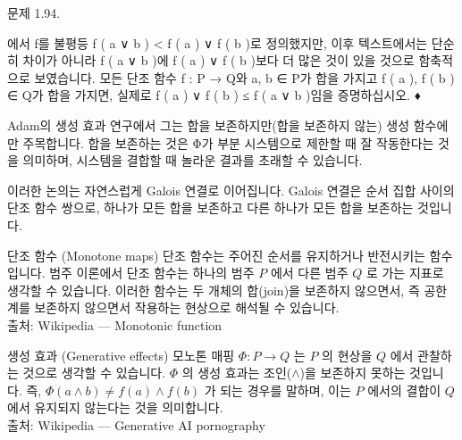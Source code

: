 \documentclass[11pt, a4paper, twoside, openany]{book}
\begin{document}
\par\medskip
문제 1.94. 
\begin{definitionbox}[정의 1.93]
\hspace{0pt}에서 f\hspace{0pt}를 불평등 f ( a ∨ b ) < f ( a ) ∨ f ( b )로 정의했지만, 이후 텍스트에서는 단순히 차이가 아니라 f ( a ∨ b )에 f ( a ) ∨ f ( b )보다 더 많은 것이 있을 것으로 함축적으로 보였습니다. 모든 단조 함수 f : P → Q\hspace{0pt}와 a, b ∈ P\hspace{0pt}가 합을 가지고 f ( a ), f ( b ) ∈ Q\hspace{0pt}가 합을 가지면, 실제로 f ( a ) ∨ f ( b ) ≤ f ( a ∨ b )임을 증명하십시오.
♦
\end{definitionbox}

\par\medskip
Adam\hspace{0pt}의 생성 효과 연구에서 그는 합을 보존하지만(합을 보존하지 않는) 생성 함수에만 주목합니다. 합을 보존하는 것은 Φ가 부분 시스템으로 제한할 때 잘 작동한다는 것을 의미하며, 시스템을 결합할 때 놀라운 결과를 초래할 수 있습니다.

\par\medskip
이러한 논의는 자연스럽게 Galois 연결로 이어집니다. Galois 연결은 순서 집합 사이의 단조 함수 쌍으로, 하나가 모든 합을 보존하고 다른 하나가 모든 합을 보존하는 것입니다.

\begin{deepresearch}{단조 함수 (Monotone maps)}
단조 함수는 주어진 순서를 유지하거나 반전시키는 함수입니다.  범주 이론에서 단조 함수는 하나의 범주 $P$ 에서 다른 범주 $Q$ 로 가는 지표로 생각할 수 있습니다.  이러한 함수는 두 개체의 합(join)을 보존하지 않으면서, 즉 공한계를 보존하지 않으면서 작용하는 현상으로 해석될 수 있습니다.
\\[4pt]{\footnotesize\color{ctgray} 출처: Wikipedia — Monotonic function}
\end{deepresearch}

\begin{deepresearch}{생성 효과 (Generative effects)}
모노톤 매핑 $\Phi : P \rightarrow Q$ 는 $P$ 의 현상을 $Q$ 에서 관찰하는 것으로 생각할 수 있습니다.  $\Phi$ 의 생성 효과는 조인($\wedge$)을 보존하지 못하는 것입니다. 즉, $\Phi(a \wedge b) \neq f(a) \wedge f(b)$ 가 되는 경우를 말하며, 이는 $P$ 에서의 결합이 $Q$ 에서 유지되지 않는다는 것을 의미합니다.
\\[4pt]{\footnotesize\color{ctgray} 출처: Wikipedia — Generative AI pornography}
\end{deepresearch}
\end{document}
